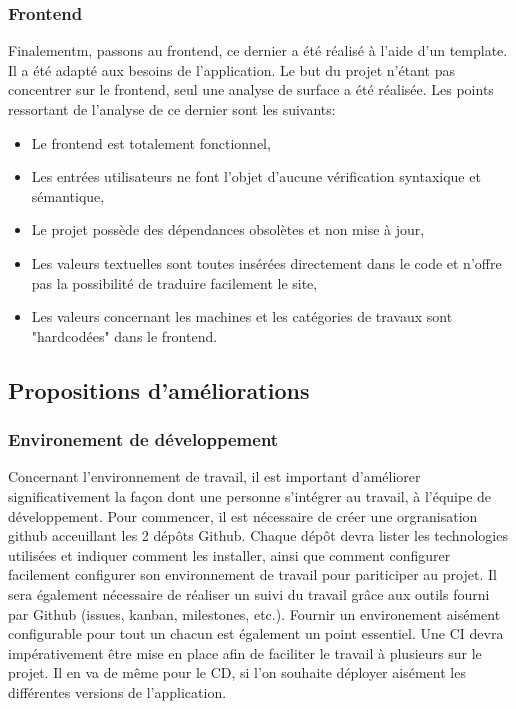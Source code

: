 \documentclass[
    iai, %
    il, %
]{heig-tb}
\begin{document}
\subsubsection{Frontend}
Finalementm, passons au frontend, ce dernier a été réalisé à l'aide d'un template. Il a été adapté aux besoins de l'application. Le but du projet n'étant pas concentrer sur le frontend, seul une analyse de surface a été réalisée.
Les points ressortant de l'analyse de ce dernier sont les suivants:
\begin{itemize}
    \item Le frontend est totalement fonctionnel,
    \item Les entrées utilisateurs ne font l'objet d'aucune vérification syntaxique et sémantique,
    \item Le projet possède des dépendances obsolètes et non mise à jour,
    \item Les valeurs textuelles sont toutes insérées directement dans le code et n'offre pas la possibilité de traduire facilement le site,
    \item Les valeurs concernant les machines et les catégories de travaux sont "hardcodées" dans le frontend.
\end{itemize}

\subsection{Propositions d'améliorations}

\subsubsection{Environement de développement}
Concernant l'environnement de travail, il est important d'améliorer significativement la façon dont une personne s'intégrer au travail, à l'équipe de développement. \newline
Pour commencer, il est nécessaire de créer une orgranisation github acceuillant les 2 dépôts Github. Chaque dépôt devra lister les technologies utilisées et indiquer comment les installer, ainsi que comment configurer facilement configurer son environnement de travail pour pariticiper au projet. \newline
Il sera également nécessaire de réaliser un suivi du travail grâce aux outils fourni par Github (issues, kanban, milestones, etc.).  \newline
Fournir un environement aisément configurable pour tout un chacun est également un point essentiel.
Une CI devra impérativement être mise en place afin de faciliter le travail à plusieurs sur le projet. Il en va de même pour le CD, si l'on souhaite déployer aisément les différentes versions de l'application.
\end{document}
